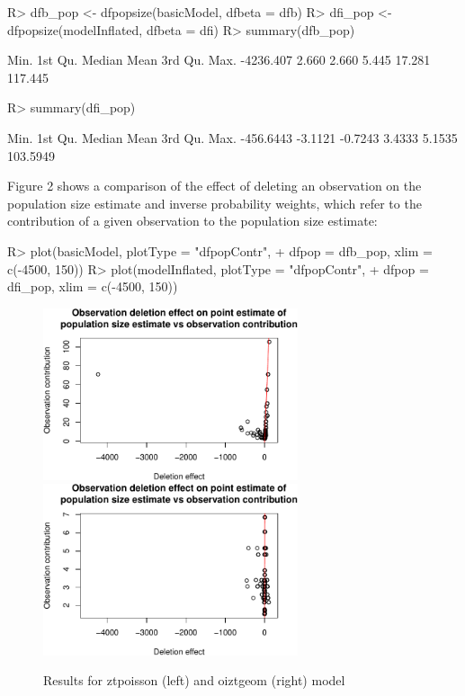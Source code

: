 \documentclass[nojss]{jss}
\newcommand{\1}{\mathcal{I}} \newcommand{\bZero}{\boldsymbol{0}}
\begin{document}
\begin{CodeChunk}
\begin{CodeInput}
R> dfb_pop <- dfpopsize(basicModel, dfbeta = dfb)
R> dfi_pop <- dfpopsize(modelInflated, dfbeta = dfi)
R> summary(dfb_pop)
\end{CodeInput}
\begin{CodeOutput}
     Min.   1st Qu.    Median      Mean   3rd Qu.      Max.
-4236.407     2.660     2.660     5.445    17.281   117.445
\end{CodeOutput}
\begin{CodeInput}
R> summary(dfi_pop)
\end{CodeInput}
\begin{CodeOutput}
     Min.   1st Qu.    Median      Mean   3rd Qu.      Max.
-456.6443   -3.1121   -0.7243    3.4333    5.1535  103.5949
\end{CodeOutput}
\end{CodeChunk}

Figure 2 shows a comparison of the effect of deleting an observation on
the population size estimate and inverse probability weights, which
refer to the contribution of a given observation to the population size
estimate:

\begin{CodeChunk}
\begin{CodeInput}
R> plot(basicModel, plotType = "dfpopContr",
+      dfpop = dfb_pop, xlim = c(-4500, 150))
R> plot(modelInflated, plotType = "dfpopContr",
+      dfpop = dfi_pop, xlim = c(-4500, 150))
\end{CodeInput}
\begin{figure}[ht]

{\centering \includegraphics[width=7.5cm]{singleRcapture_files/figure-latex/dfpopsize_plot-1} \includegraphics[width=7.5cm]{singleRcapture_files/figure-latex/dfpopsize_plot-2}

}

\caption[Results for ztpoisson (left) and oiztgeom (right) model]{Results for ztpoisson (left) and oiztgeom (right) model}\label{fig:dfpopsize_plot}
\end{figure}
\end{CodeChunk}
\end{document}
